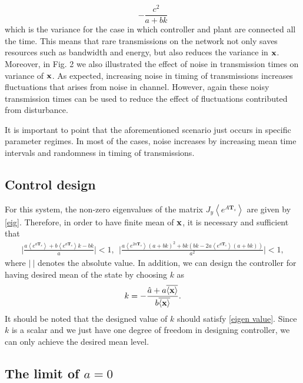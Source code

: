 \documentclass[letterpaper, 10 pt,one column, conference]{ieeeconf}  %
\begin{document}
\begin{equation}
-\frac{c^2}{a+bk}
\end{equation}
which is the variance for the case in which controller and plant are connected all the time.
This means that rare transmissions on the network not only saves resources such as bandwidth and energy, but also reduces the variance in $\bold x$.
Moreover, in Fig. 2 we also illustrated the effect of noise in transmission times on variance of $\bold x $. As expected, increasing noise in timing of transmissions increases fluctuations that arises from noise in channel. However, again these noisy transmission times can be used to reduce the effect of fluctuations contributed from disturbance.

It is important to point that the aforementioned scenario just occurs in specific parameter regimes. In most of the cases, noise increases by increasing mean time intervals and randomness in timing of transmissions. 


\subsection{Control design}	
For this system, the non-zero eigenvalues of the matrix $J_y \left \langle e^{A \boldsymbol T_s }\right \rangle$ are given by \eqref{eig}. 
Therefore, in order to have finite mean of $\bold x$, it is necessary and sufficient that 
	\begin{align}
\big \vert \frac{a\left \langle e^{a \boldsymbol T_s} \right \rangle +b \left \langle e^{a \boldsymbol T_s} \right \rangle  k-b k}{a} \big \vert<1,\ \ 
 \big \vert \frac{a\left \langle e^{2 a \boldsymbol T_s} \right \rangle   (a+b k)^2+b k (b k-2 a\left \langle e^{a \boldsymbol T_s} \right \rangle   (a+b k))}{a^2}  \big \vert<1, \label{eigen value}
	\end{align} 
where $\vert \ \vert$ denotes the absolute value.
In addition, we can design the controller for having desired mean of the state by choosing $k$ as
\begin{equation}
k=-\frac{\hat{a}+ a\overline{\langle \bold x \rangle} }{b\overline{\langle \bold x \rangle}} \label{K}.
\end{equation}
It should be noted that the designed value of $k$ should satisfy \eqref{eigen value}. Since $k$ is a scalar and we just have one degree of freedom in designing controller,  we can only achieve the desired mean level. 

\subsection{The limit of $a=0$}
\end{document}
